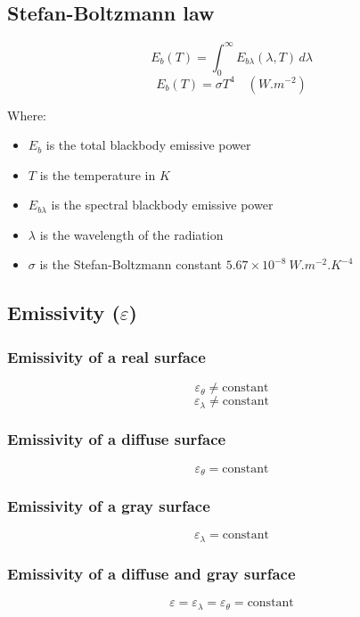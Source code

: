 \documentclass[11pt]{article}
\begin{document}
\subsection{Stefan-Boltzmann law}
\label{sec:org4565557}
\[E_b (T) = \int_0^{\infty} E_{b \lambda} (\lambda, T) \, d \lambda\]
\[E_b (T) = \sigma T^4 \quad (\unit{W.m^{-2}})\]

Where:
\begin{itemize}
\item \(E_b\) is the total blackbody emissive power
\item \(T\) is the temperature in \(\unit{K}\)
\item \(E_{b \lambda}\) is the spectral blackbody emissive power
\item \(\lambda\) is the wavelength of the radiation
\item \(\sigma\) is the Stefan-Boltzmann constant \(5.67 \times 10^{-8} \ \unit{W.m^{-2}.K^{-4}}\)
\end{itemize}

\subsection{Emissivity (\(\varepsilon\))}
\label{sec:orgccb3f2e}

\subsubsection{Emissivity of a real surface}
\label{sec:orgaab38d9}
\[\varepsilon_{\theta} \ne \text{constant}\]
\[\varepsilon_{\lambda} \ne \text{constant}\]

\subsubsection{Emissivity of a diffuse surface}
\label{sec:org46b1e94}
\[\varepsilon_{\theta} = \text{constant}\]

\subsubsection{Emissivity of a gray surface}
\label{sec:orga0e12e2}
\[\varepsilon_{\lambda} = \text{constant}\]

\subsubsection{Emissivity of a diffuse and gray surface}
\label{sec:org4d089da}
\[\varepsilon = \varepsilon_{\lambda} = \varepsilon_{\theta} = \text{constant}\]
\end{document}
